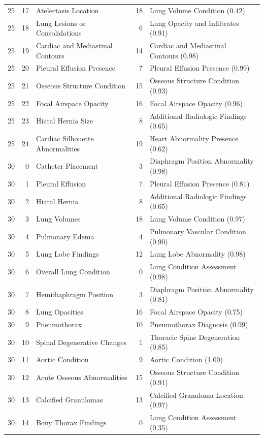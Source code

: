 \begin{table}[t]
\begin{tabular}{rrlrl}
25 & 17 & Atelectasis Location & 18 & Lung Volume Condition (0.42) \\
25 & 18 & Lung Lesions or Consolidations & 6 & Lung Opacity and Infiltrates (0.91) \\
25 & 19 & Cardiac and Mediastinal Contours & 14 & Cardiac and Mediastinal Contours (0.98) \\
25 & 20 & Pleural Effusion Presence & 7 & Pleural Effusion Presence (0.99) \\
25 & 21 & Osseous Structure Condition & 15 & Osseous Structure Condition (0.93) \\
25 & 22 & Focal Airspace Opacity & 16 & Focal Airspace Opacity (0.96) \\
25 & 23 & Hiatal Hernia Size & 8 & Additional Radiologic Findings (0.65) \\
25 & 24 & Cardiac Silhouette Abnormalities & 19 & Heart Abnormality Presence (0.62) \\
30 & 0 & Catheter Placement & 3 & Diaphragm Position Abnormality (0.98) \\
30 & 1 & Pleural Effusion & 7 & Pleural Effusion Presence (0.81) \\
30 & 2 & Hiatal Hernia & 8 & Additional Radiologic Findings (0.65) \\
30 & 3 & Lung Volumes & 18 & Lung Volume Condition (0.97) \\
30 & 4 & Pulmonary Edema & 4 & Pulmonary Vascular Condition (0.90) \\
30 & 5 & Lung Lobe Findings & 12 & Lung Lobe Abnormality (0.98) \\
30 & 6 & Overall Lung Condition & 0 & Lung Condition Assessment (0.98) \\
30 & 7 & Hemidiaphragm Position & 3 & Diaphragm Position Abnormality (0.81) \\
30 & 8 & Lung Opacities & 16 & Focal Airspace Opacity (0.75) \\
30 & 9 & Pneumothorax & 10 & Pneumothorax Diagnosis (0.99) \\
30 & 10 & Spinal Degenerative Changes & 1 & Thoracic Spine Degeneration (0.85) \\
30 & 11 & Aortic Condition & 9 & Aortic Condition (1.00) \\
30 & 12 & Acute Osseous Abnormalities & 15 & Osseous Structure Condition (0.91) \\
30 & 13 & Calcified Granulomas & 13 & Calcified Granuloma Location (0.97) \\
30 & 14 & Bony Thorax Findings & 0 & Lung Condition Assessment (0.35) \\

\end{tabular}
\end{table}
